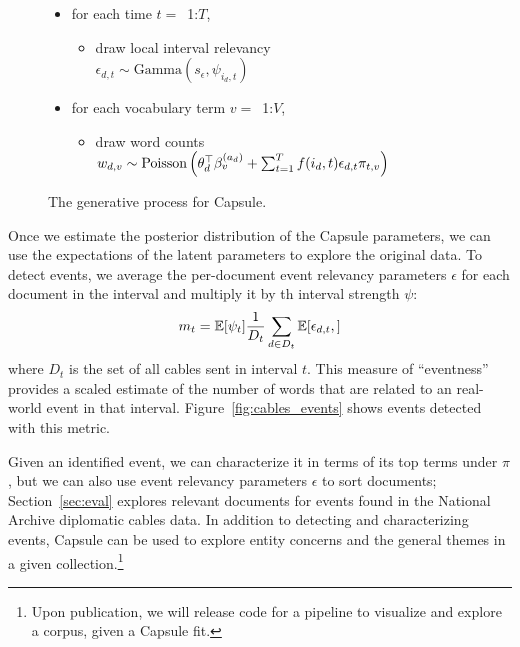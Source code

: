 \begin{figure}[htb]
\begin{mdframed}
\begin{itemize}[leftmargin=*]
\begin{itemize}[leftmargin=*]
\begin{itemize}[leftmargin=*]
		\end{itemize}
	\item for each time $t=$~1:$T$,
		\begin{itemize}[leftmargin=*]
			\item draw local interval relevancy \\$\epsilon_{d,t} \sim \mbox{Gamma}(s_\epsilon, \psi_{i_d,t})$ 
		\end{itemize}
	\item for each vocabulary term $v=$~1:$V$,
		\begin{itemize}[leftmargin=*]
			\item draw word counts $w_{d,v} \sim \\ \mbox{Poisson}\left(\theta_d^\top\beta^{(a_d)}_v + \sum_{t=1}^T f(i_d, t) \epsilon_{d,t} \pi_{t,v}\right)$
		\end{itemize}
	\end{itemize}
\end{itemize}
\end{mdframed}
\caption{The generative process for Capsule.}
\label{fig:generative-model}
\end{figure}


Once we estimate the posterior distribution of the Capsule parameters, we can use the expectations of the latent parameters to explore the original data.  To detect events, we average the per-document event relevancy parameters $\epsilon$ for each document in the interval and multiply it by th interval strength $\psi$:
\begin{equation}
m_t = \mathbb{E}[\psi_t] \frac{1}{D_t} \sum_{d \in D_t} \mathbb{E}[\epsilon_{d,t},]
\label{eq:eventness}
\end{equation}
where $D_t$ is the set of all cables sent in interval $t$. This measure of ``eventness'' provides a scaled estimate of the number of words that are related to an real-world event in that interval.  Figure~\ref{fig:cables_events} shows events detected with this metric.

Given an identified event, we can characterize it in terms of its top terms under $\pi$, but we can also use event relevancy parameters $\epsilon$ to sort documents; Section~\ref{sec:eval} explores relevant documents for events found in the National Archive diplomatic cables data.
In addition to detecting and characterizing events, Capsule can be used to explore entity concerns and the general themes in a given collection.\footnote{Upon publication, we will release code for a pipeline to visualize and explore a corpus, given a Capsule fit.}

